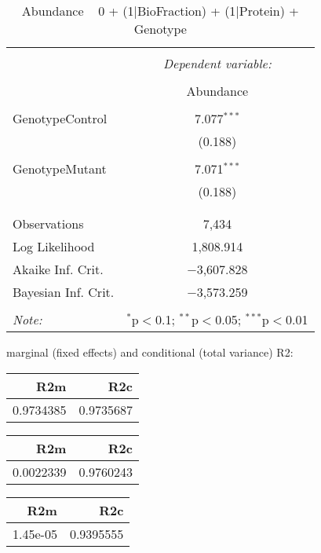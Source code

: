 \documentclass[11pt]{report}
\begin{document}
\begin{table}[!htbp] \centering 
  \caption{Abundance ~ 0 + (1|BioFraction) + (1|Protein) + Genotype} 
  \label{} 
\begin{tabular}{@{\extracolsep{5pt}}lc} 
\\[-1.8ex]\hline 
\hline \\[-1.8ex] 
 & \multicolumn{1}{c}{\textit{Dependent variable:}} \\ 
\cline{2-2} 
\\[-1.8ex] & Abundance \\ 
\hline \\[-1.8ex] 
 GenotypeControl & 7.077$^{***}$ \\ 
  & (0.188) \\ 
  & \\ 
 GenotypeMutant & 7.071$^{***}$ \\ 
  & (0.188) \\ 
  & \\ 
\hline \\[-1.8ex] 
Observations & 7,434 \\ 
Log Likelihood & 1,808.914 \\ 
Akaike Inf. Crit. & $-$3,607.828 \\ 
Bayesian Inf. Crit. & $-$3,573.259 \\ 
\hline 
\hline \\[-1.8ex] 
\textit{Note:}  & \multicolumn{1}{r}{$^{*}$p$<$0.1; $^{**}$p$<$0.05; $^{***}$p$<$0.01} \\ 
\end{tabular} 
\end{table} 
marginal (fixed effects) and conditional (total variance) R2:

\begin{tabular}{r|r}
\hline
R2m & R2c\\
\hline
0.9734385 & 0.9735687\\
\hline
\end{tabular}

\begin{tabular}{r|r}
\hline
R2m & R2c\\
\hline
0.0022339 & 0.9760243\\
\hline
\end{tabular}

\begin{tabular}{r|r}
\hline
R2m & R2c\\
\hline
1.45e-05 & 0.9395555\\
\hline
\end{tabular}
\end{document}
